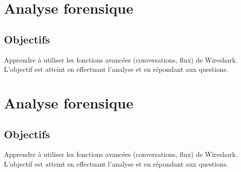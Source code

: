 \documentclass[11pt,a4paper]{article}
\begin{document}
\section{Analyse forensique}

\subsection{Objectifs}

Apprendre à utiliser les fonctions avancées (conversations, flux) de Wireshark. L'objectif est atteint en effectuant l'analyse et en répondant aux questions.

\section{Analyse forensique}

\subsection{Objectifs}

Apprendre à utiliser les fonctions avancées (conversations, flux) de Wireshark. L'objectif est atteint en effectuant l'analyse et en répondant aux questions.
\end{document}

